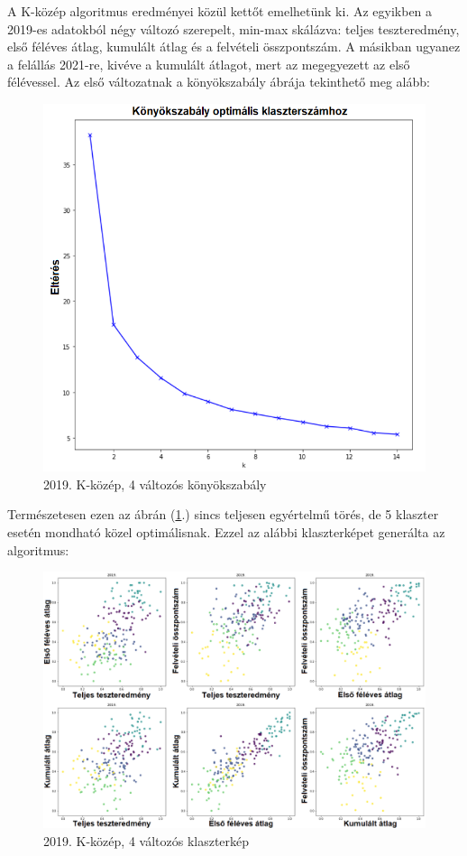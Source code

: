 \documentclass[12pt]{article}
\begin{document}
A K-közép algoritmus eredményei közül kettőt emelhetünk ki. Az egyikben a 2019-es adatokból négy változó szerepelt, min-max skálázva: teljes teszteredmény, első féléves átlag, kumulált átlag és a felvételi összpontszám. A másikban ugyanez a felállás 2021-re, kivéve a kumulált átlagot, mert az megegyezett az első félévessel. Az első változatnak a könyökszabály ábrája tekinthető meg alább:

\begin{figure}[H]
\centering
\includegraphics[scale = 0.6]{kepek/2019_kmeans_best_konyok.png}
\caption{2019. K-közép, 4 változós könyökszabály}
\label{fig:2019_kmeans_best_konyok}
\end{figure}

Természetesen ezen az ábrán (\ref{fig:2019_kmeans_best_konyok}.) sincs teljesen egyértelmű törés, de 5 klaszter esetén mondható közel optimálisnak. Ezzel az alábbi klaszterképet generálta az algoritmus:

\begin{figure}[H]
\centering
\includegraphics[width = \textwidth]{kepek/2019_kmeans_5.png}
\caption{2019. K-közép, 4 változós klaszterkép}
\label{fig:2019_kmeans_5}
\end{figure}
\end{document}

